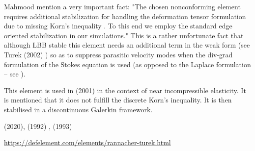 Mahmood \etal \cite{maky17} mention a very important fact: "The chosen nonconforming element requires
additional stabilization for handling the deformation tensor formulation due to missing Korn's inequality 
\cite{horg95,knob00,bren04}.
To this end we employ the standard edge oriented stabilization \cite{tuos02,tuou07} in our simulations."
This is a rather unfortunate fact that although LBB stable this element needs an additional 
term in the weak form (see Turek \etal (2002) \cite{tuos02}) 
so as to suppress parasitic velocity modes when the div-grad formulation 
of the Stokes equation is used (as opposed to the Laplace formulation -- see \cite[Section 6.5.2]{dohu03}).

This element is used in \textcite{hala01} (2001) in the context of near incompressible elasticity. 
It is mentioned that it does not fulfill the discrete Korn's inequality. It is then stabilised 
in a discontinuous Galerkin framework.

\Literature \textcite{shee20} (2020), \textcite{chen92} (1992) , \textcite{chen93} (1993) 

\url{https://defelement.com/elements/rannacher-turek.html}




